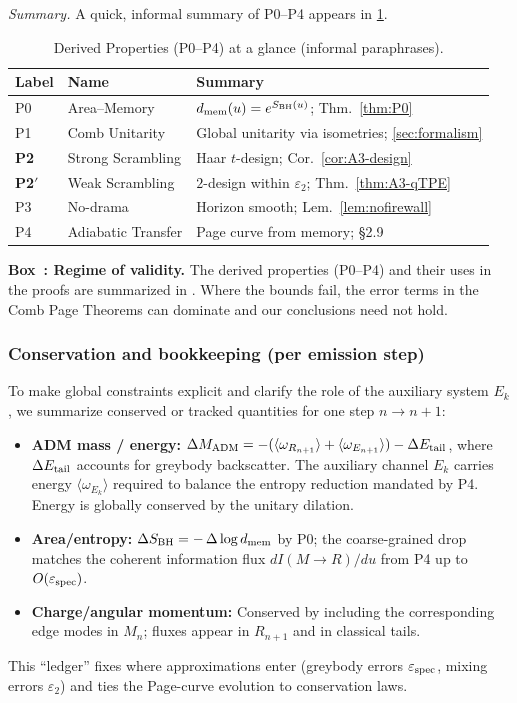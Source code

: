 \documentclass[aps,prd,preprint,onecolumn,superscriptaddress,nofootinbib,longbibliography,floatfix,11pt,showpacs,showkeys]{revtex4-2}
\newcommand{\Ptwo}{\textbf{P2}\xspace}
\newcommand{\PtwoPrime}{\textbf{P2$'$}\xspace}
\newcounter{boxedresult}
\newenvironment{boxedresult}[1]{\refstepcounter{boxedresult}\begin{infobox}\noindent\textbf{Box~\theboxedresult: #1.}}{\end{infobox}}
\theoremstyle{plain}
\theoremstyle{definition}
\theoremstyle{remark}
\begin{document}
\noindent\emph{Summary.} A quick, informal summary of P0--P4 appears in \cref{tab:postulates_glance}.

\begin{table}[htbp]
\centering
\caption{Derived Properties (P0--P4) at a glance (informal paraphrases).}
\label{tab:postulates_glance}
\footnotesize
\begin{tabular*}{\textwidth}{@{\extracolsep{\fill}}lll@{}}
\toprule
\textbf{Label} & \textbf{Name} & \textbf{Summary}\\
\midrule
P0 & Area--Memory & $d_{\rm mem}(u)=e^{S_{\rm BH}(u)}$; Thm.~\ref{thm:P0}\\
P1 & Comb Unitarity & Global unitarity via isometries; \cref{sec:formalism}\\
\Ptwo & Strong Scrambling & Haar $t$-design; Cor.~\ref{cor:A3-design}\\
\PtwoPrime & Weak Scrambling & $2$-design within $\varepsilon_2$; Thm.~\ref{thm:A3-qTPE}\\
P3 & No-drama & Horizon smooth; Lem.~\ref{lem:nofirewall}\\
P4 & Adiabatic Transfer & Page curve from memory; §2.9\\
\bottomrule
\end{tabular*}
\end{table}
\begin{boxedresult}{Regime of validity}\label{tab:domain_validity}
The derived properties (P0--P4) and their uses in the proofs are summarized in . Where the bounds fail, the error terms in the Comb Page Theorems can dominate and our conclusions need not hold.
\end{boxedresult}

\subsubsection{Conservation and bookkeeping (per emission step)}
To make global constraints explicit and clarify the role of the auxiliary system $E_k$, we summarize conserved or tracked quantities for one step $n\!\to\!n{+}1$:
\begin{itemize}[leftmargin=*]
  \item \textbf{ADM mass / energy:} $\Delta M_{\rm ADM} = -(\langle \omega_{R_{n+1}}\rangle + \langle \omega_{E_{n+1}}\rangle) - \Delta E_{\rm tail}$, where $\Delta E_{\rm tail}$ accounts for greybody backscatter. The auxiliary channel $E_k$ carries energy $\langle \omega_{E_{k}}\rangle$ required to balance the entropy reduction mandated by P4. Energy is globally conserved by the unitary dilation.
  \item \textbf{Area/entropy:} $\Delta S_{\rm BH} = -\,\Delta \log d_{\rm mem}$ by P0; the coarse-grained drop matches the coherent information flux $dI(M\!\to\!R)/du$ from P4 up to $O(\varepsilon_{\rm spec})$.
  \item \textbf{Charge/angular momentum:} Conserved by including the corresponding edge modes in $M_n$; fluxes appear in $R_{n+1}$ and in classical tails.
\end{itemize}
This ``ledger'' fixes where approximations enter (greybody errors $\varepsilon_{\rm spec}$, mixing errors $\varepsilon_2$) and ties the Page-curve evolution to conservation laws.
\end{document}
